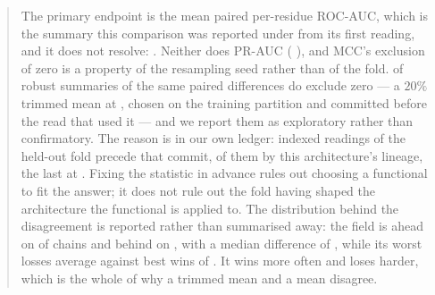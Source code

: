 \documentclass[11pt]{article}
\begin{document}
\begin{abstract}
The primary endpoint is the mean paired per-residue ROC-AUC, which is the summary
this comparison was reported under from its first reading, and it does not
resolve: \TabAucD{} \TabAucDCI{}. Neither does PR-AUC (\TabPrD{} \TabPrDCI{}),
and MCC's exclusion of zero is a property of the resampling seed rather than of
the fold. \EndNExploratoryResolving{} of \EndNExploratory{} robust summaries of
the same paired differences do exclude zero --- a \(20\%\) trimmed mean at
\PreRegTestDelta{} \PreRegTestCI{}, chosen on the training partition and
committed before the read that used it --- and we report them as exploratory
rather than confirmatory. The reason is in our own ledger: \EndReadsBefore{}
indexed readings of the held-out fold precede that commit, \EndLineageBefore{} of
them by this architecture's lineage, the last at \EndPriorBestAuc{}. Fixing the
statistic in advance rules out choosing a functional to fit the answer; it does
not rule out the fold having shaped the architecture the functional is applied
to. The distribution behind the disagreement is reported rather than summarised
away: the field is ahead on \EndWins{} of \NUnits{} chains and behind on
\EndLosses{}, with a median difference of \EndMedianDelta{}, while its worst
losses average \EndWorstLosses{} against best wins of \EndBestWins{}. It wins
more often and loses harder, which is the whole of why a trimmed mean and a mean
disagree.


\end{abstract}
\end{document}
